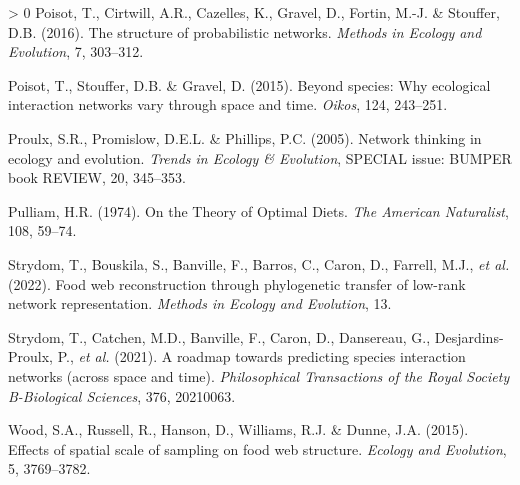 \documentclass[10pt,oneside]{article}
\newlength{\cslhangindent}
\newenvironment{CSLReferences}[3] %
 {%
  \setlength{\parindent}{0pt}
  \ifodd #1 \everypar{\setlength{\hangindent}{\cslhangindent}}\ignorespaces\fi
  \ifnum #2 > 0
  \setlength{\parskip}{#2\baselineskip}
  \fi
 }%
 {}
\begin{document}
\begin{CSLReferences}{1}{0}
\leavevmode\hypertarget{ref-Poisot2016Structure}{}%
Poisot, T., Cirtwill, A.R., Cazelles, K., Gravel, D., Fortin, M.-J. \&
Stouffer, D.B. (2016). The structure of probabilistic networks.
\emph{Methods in Ecology and Evolution}, 7, 303--312.

\leavevmode\hypertarget{ref-Poisot2015Speciesa}{}%
Poisot, T., Stouffer, D.B. \& Gravel, D. (2015). Beyond species: Why
ecological interaction networks vary through space and time.
\emph{Oikos}, 124, 243--251.

\leavevmode\hypertarget{ref-Proulx2005NetThi}{}%
Proulx, S.R., Promislow, D.E.L. \& Phillips, P.C. (2005). Network
thinking in ecology and evolution. \emph{Trends in Ecology \&
Evolution}, SPECIAL issue: BUMPER book REVIEW, 20, 345--353.

\leavevmode\hypertarget{ref-Pulliam1974Theory}{}%
Pulliam, H.R. (1974). On the Theory of Optimal Diets. \emph{The American
Naturalist}, 108, 59--74.

\leavevmode\hypertarget{ref-Strydom2022Food}{}%
Strydom, T., Bouskila, S., Banville, F., Barros, C., Caron, D., Farrell,
M.J., \emph{et al.} (2022). Food web reconstruction through phylogenetic
transfer of low-rank network representation. \emph{Methods in Ecology
and Evolution}, 13.

\leavevmode\hypertarget{ref-Strydom2021Roadmapa}{}%
Strydom, T., Catchen, M.D., Banville, F., Caron, D., Dansereau, G.,
Desjardins-Proulx, P., \emph{et al.} (2021). A roadmap towards
predicting species interaction networks (across space and time).
\emph{Philosophical Transactions of the Royal Society B-Biological
Sciences}, 376, 20210063.

\leavevmode\hypertarget{ref-Wood2015Effects}{}%
Wood, S.A., Russell, R., Hanson, D., Williams, R.J. \& Dunne, J.A.
(2015). Effects of spatial scale of sampling on food web structure.
\emph{Ecology and Evolution}, 5, 3769--3782.

\end{CSLReferences}
\end{document}
